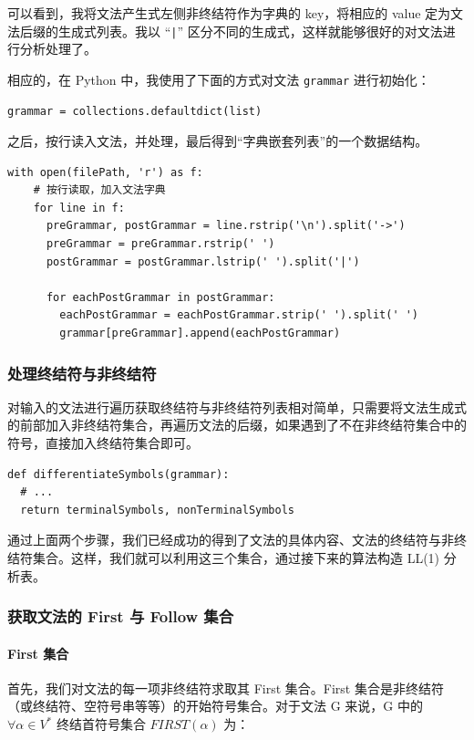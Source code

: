 \documentclass[UTF8]{ctexart}
\begin{document}
可以看到，我将文法产生式左侧非终结符作为字典的 key，将相应的 value 定为文法后缀的生成式列表。我以 “\texttt{|}” 区分不同的生成式，这样就能够很好的对文法进行分析处理了。

相应的，在 Python 中，我使用了下面的方式对文法 \texttt{grammar} 进行初始化：

\begin{verbatim}
grammar = collections.defaultdict(list)
\end{verbatim}

之后，按行读入文法，并处理，最后得到“字典嵌套列表”的一个数据结构。

\begin{verbatim}
with open(filePath, 'r') as f:
    # 按行读取，加入文法字典
    for line in f:
      preGrammar, postGrammar = line.rstrip('\n').split('->')
      preGrammar = preGrammar.rstrip(' ')
      postGrammar = postGrammar.lstrip(' ').split('|')

      for eachPostGrammar in postGrammar:
        eachPostGrammar = eachPostGrammar.strip(' ').split(' ')
        grammar[preGrammar].append(eachPostGrammar)
\end{verbatim}

\subsubsection{处理终结符与非终结符}
对输入的文法进行遍历获取终结符与非终结符列表相对简单，只需要将文法生成式的前部加入非终结符集合，再遍历文法的后缀，如果遇到了不在非终结符集合中的符号，直接加入终结符集合即可。

\begin{verbatim}
def differentiateSymbols(grammar):
  # ...
  return terminalSymbols, nonTerminalSymbols
\end{verbatim}

通过上面两个步骤，我们已经成功的得到了文法的具体内容、文法的终结符与非终结符集合。这样，我们就可以利用这三个集合，通过接下来的算法构造 LL(1) 分析表。

\subsubsection{获取文法的 First 与 Follow 集合}
\paragraph{First 集合}
首先，我们对文法的每一项非终结符求取其 First 集合。First 集合是非终结符（或终结符、空符号串等等）的开始符号集合。对于文法 G 来说，G 中的 $\forall \alpha \in V^*$ 终结首符号集合 $FIRST(\alpha)$ 为：
\end{document}
